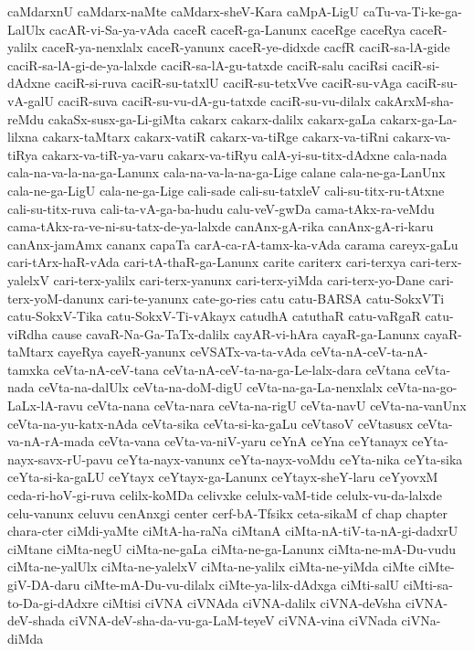 {caMdarxnU
caMdarx-naMte
caMdarx-sheV-Kara
caMpA-LigU
caTu-va-Ti-ke-ga-LalUlx
cacAR-vi-Sa-ya-vAda
caceR
caceR-ga-Lanunx
caceRge
caceRya
caceR-yalilx
caceR-ya-nenxlalx
caceR-yanunx
caceR-ye-didxde
cacfR
caciR-sa-lA-gide
caciR-sa-lA-gi-de-ya-lalxde
caciR-sa-lA-gu-tatxde
caciR-salu
caciRsi
caciR-si-dAdxne
caciR-si-ruva
caciR-su-tatxlU
caciR-su-tetxVve
caciR-su-vAga
caciR-su-vA-galU
caciR-suva
caciR-su-vu-dA-gu-tatxde
caciR-su-vu-dilalx
cakArxM-sha-reMdu
cakaSx-susx-ga-Li-giMta
cakarx
cakarx-dalilx
cakarx-gaLa
cakarx-ga-La-lilxna
cakarx-taMtarx
cakarx-vatiR
cakarx-va-tiRge
cakarx-va-tiRni
cakarx-va-tiRya
cakarx-va-tiR-ya-varu
cakarx-va-tiRyu
calA-yi-su-titx-dAdxne
cala-nada
cala-na-va-la-na-ga-Lanunx
cala-na-va-la-na-ga-Lige
calane
cala-ne-ga-LanUnx
cala-ne-ga-LigU
cala-ne-ga-Lige
cali-sade
cali-su-tatxleV
cali-su-titx-ru-tAtxne
cali-su-titx-ruva
cali-ta-vA-ga-ba-hudu
calu-veV-gwDa
cama-tAkx-ra-veMdu
cama-tAkx-ra-ve-ni-su-tatx-de-ya-lalxde
canAnx-gA-rika
canAnx-gA-ri-karu
canAnx-jamAmx
cananx
capaTa
carA-ca-rA-tamx-ka-vAda
carama
careyx-gaLu
cari-tArx-haR-vAda
cari-tA-thaR-ga-Lanunx
carite
cariterx
cari-terxya
cari-terx-yalelxV
cari-terx-yalilx
cari-terx-yanunx
cari-terx-yiMda
cari-terx-yo-Dane
cari-terx-yoM-danunx
cari-te-yanunx
cate-go-ries
catu
catu-BARSA
catu-SokxVTi
catu-SokxV-Tika
catu-SokxV-Ti-vAkayx
catudhA
catuthaR
catu-vaRgaR
catu-viRdha
cause
cavaR-Na-Ga-TaTx-dalilx
cayAR-vi-hAra
cayaR-ga-Lanunx
cayaR-taMtarx
cayeRya
cayeR-yanunx
ceVSATx-va-ta-vAda
ceVta-nA-ceV-ta-nA-tamxka
ceVta-nA-ceV-tana
ceVta-nA-ceV-ta-na-ga-Le-lalx-dara
ceVtana
ceVta-nada
ceVta-na-dalUlx
ceVta-na-doM-digU
ceVta-na-ga-La-nenxlalx
ceVta-na-go-LaLx-lA-ravu
ceVta-nana
ceVta-nara
ceVta-na-rigU
ceVta-navU
ceVta-na-vanUnx
ceVta-na-yu-katx-nAda
ceVta-sika
ceVta-si-ka-gaLu
ceVtasoV
ceVtasusx
ceVta-va-nA-rA-mada
ceVta-vana
ceVta-va-niV-yaru
ceYnA
ceYna
ceYtanayx
ceYta-nayx-savx-rU-pavu
ceYta-nayx-vanunx
ceYta-nayx-voMdu
ceYta-nika
ceYta-sika
ceYta-si-ka-gaLU
ceYtayx
ceYtayx-ga-Lanunx
ceYtayx-sheY-laru
ceYyovxM
ceda-ri-hoV-gi-ruva
celilx-koMDa
celivxke
celulx-vaM-tide
celulx-vu-da-lalxde
celu-vanunx
celuvu
cenAnxgi
center
cerf-bA-Tfsikx
ceta-sikaM
cf
chap
chapter
chara-cter
ciMdi-yaMte
ciMtA-ha-raNa
ciMtanA
ciMta-nA-tiV-ta-nA-gi-dadxrU
ciMtane
ciMta-negU
ciMta-ne-gaLa
ciMta-ne-ga-Lanunx
ciMta-ne-mA-Du-vudu
ciMta-ne-yalUlx
ciMta-ne-yalelxV
ciMta-ne-yalilx
ciMta-ne-yiMda
ciMte
ciMte-giV-DA-daru
ciMte-mA-Du-vu-dilalx
ciMte-ya-lilx-dAdxga
ciMti-salU
ciMti-sa-to-Da-gi-dAdxre
ciMtisi
ciVNA
ciVNAda
ciVNA-dalilx
ciVNA-deVsha
ciVNA-deV-shada
ciVNA-deV-sha-da-vu-ga-LaM-teyeV
ciVNA-vina
ciVNada
ciVNa-diMda
}
